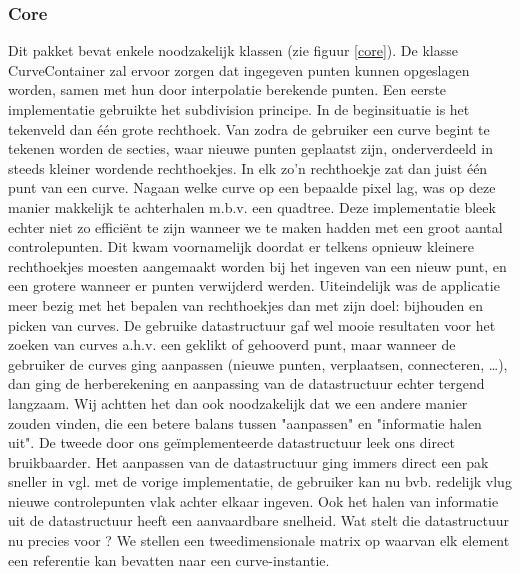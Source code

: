 \documentclass[a4paper,11pt,oneside, titlepage]{article}
\begin{document}
\subsubsection{Core}
\label{tcore}
Dit pakket bevat enkele noodzakelijk klassen (zie figuur \ref{core}).\newline \newline
De klasse CurveContainer zal ervoor zorgen dat ingegeven punten kunnen opgeslagen worden, samen
met hun door interpolatie berekende punten. \newline \newline
Een eerste implementatie gebruikte het subdivision principe. In de beginsituatie is het tekenveld
dan \'e\'en grote rechthoek. Van zodra de gebruiker een curve begint te tekenen worden de secties,
waar nieuwe punten geplaatst zijn, onderverdeeld in steeds kleiner wordende rechthoekjes. In elk zo'n
rechthoekje zat dan juist \'e\'en punt van een curve. Nagaan welke curve op een bepaalde pixel lag, was op deze manier
makkelijk te achterhalen m.b.v. een quadtree.\newline
Deze implementatie bleek echter niet zo effici\"ent te zijn wanneer we te maken hadden met een groot
aantal controlepunten. Dit kwam voornamelijk doordat er telkens opnieuw kleinere rechthoekjes
moesten aangemaakt worden bij het ingeven van een nieuw punt, en een grotere wanneer er punten verwijderd
werden. Uiteindelijk was de applicatie meer bezig met het bepalen van rechthoekjes dan met zijn
doel: bijhouden en picken van curves. De gebruike datastructuur gaf wel mooie resultaten voor het zoeken van curves a.h.v.
een geklikt of gehooverd punt, maar wanneer de gebruiker de curves ging aanpassen (nieuwe punten, verplaatsen, connecteren, \ldots), dan ging de 
herberekening en aanpassing van de datastructuur echter tergend langzaam. Wij achtten het dan ook noodzakelijk dat we een andere manier
zouden vinden, die een betere balans tussen "aanpassen" en "informatie halen uit". \newline \newline
De tweede door ons ge\"implementeerde datastructuur leek ons direct bruikbaarder. Het aanpassen van de datastructuur ging immers direct een pak sneller in vgl.
met de vorige implementatie, de gebruiker kan nu bvb. redelijk vlug nieuwe controlepunten vlak achter elkaar ingeven. Ook het halen van informatie uit de datastructuur heeft een aanvaardbare snelheid.
Wat stelt die datastructuur nu precies voor ? We stellen een tweedimensionale matrix op waarvan elk element een referentie kan bevatten naar een curve-instantie.
\end{document}
